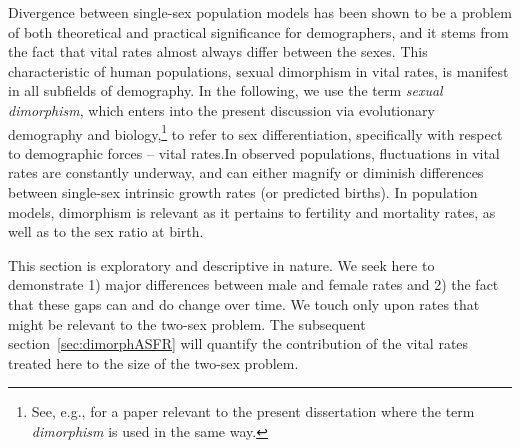  \FloatBarrier
Divergence between single-sex population models has been shown to be a problem
of both theoretical and practical significance for demographers, and it stems from
the fact that vital rates almost always differ between the sexes.
This characteristic of human populations, sexual dimorphism in vital rates,
is manifest in all subfields of demography. In the following, we use the
term \textit{sexual dimorphism}, which enters into the present discussion via
evolutionary demography and biology,\footnote{See, e.g., \citet{caswell1986two}
for a paper relevant to the present dissertation where the term \textit{dimorphism} is used
in the same way.} to refer to sex differentiation, specifically with respect to
demographic forces -- vital rates.In observed populations, fluctuations in vital rates 
are constantly underway, and can either magnify or diminish differences between 
single-sex intrinsic growth rates (or predicted births). 
In population models, dimorphism is relevant as it pertains to fertility and mortality 
rates, as well as to the sex ratio at birth.

This section is exploratory and descriptive in nature. We seek here to
demonstrate 1) major differences between male and female rates and 2) the fact
that these gaps can and do change over time. We touch only upon rates that might
be relevant to the two-sex problem. The subsequent section~\ref{sec:dimorphASFR}
will quantify the contribution of the vital rates treated here to the size of the two-sex
problem.
